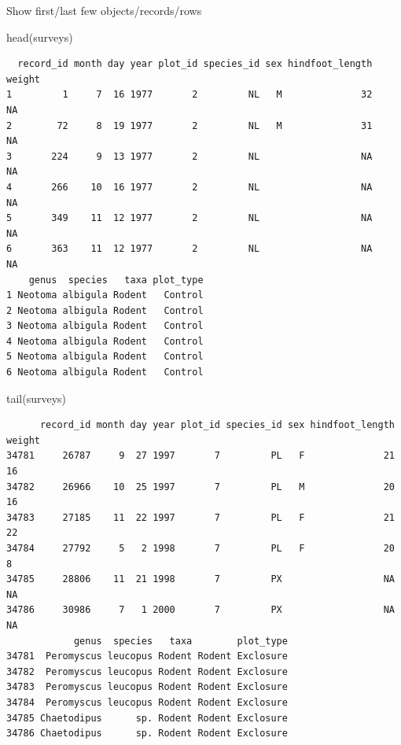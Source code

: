 \documentclass[
  letterpaper,
  DIV=11,
  numbers=noendperiod]{scrreprt}
\newenvironment{Shaded}{\begin{snugshade}}{\end{snugshade}}
\newcommand{\FunctionTok}[1]{\textcolor[rgb]{0.28,0.35,0.67}{#1}}
\newcommand{\NormalTok}[1]{\textcolor[rgb]{0.00,0.23,0.31}{#1}}
\begin{document}
Show first/last few objects/records/rows

\begin{Shaded}
\begin{Highlighting}[]
\FunctionTok{head}\NormalTok{(surveys)}
\end{Highlighting}
\end{Shaded}

\begin{verbatim}
  record_id month day year plot_id species_id sex hindfoot_length weight
1         1     7  16 1977       2         NL   M              32     NA
2        72     8  19 1977       2         NL   M              31     NA
3       224     9  13 1977       2         NL                  NA     NA
4       266    10  16 1977       2         NL                  NA     NA
5       349    11  12 1977       2         NL                  NA     NA
6       363    11  12 1977       2         NL                  NA     NA
    genus  species   taxa plot_type
1 Neotoma albigula Rodent   Control
2 Neotoma albigula Rodent   Control
3 Neotoma albigula Rodent   Control
4 Neotoma albigula Rodent   Control
5 Neotoma albigula Rodent   Control
6 Neotoma albigula Rodent   Control
\end{verbatim}

\begin{Shaded}
\begin{Highlighting}[]
\FunctionTok{tail}\NormalTok{(surveys)}
\end{Highlighting}
\end{Shaded}

\begin{verbatim}
      record_id month day year plot_id species_id sex hindfoot_length weight
34781     26787     9  27 1997       7         PL   F              21     16
34782     26966    10  25 1997       7         PL   M              20     16
34783     27185    11  22 1997       7         PL   F              21     22
34784     27792     5   2 1998       7         PL   F              20      8
34785     28806    11  21 1998       7         PX                  NA     NA
34786     30986     7   1 2000       7         PX                  NA     NA
            genus  species   taxa        plot_type
34781  Peromyscus leucopus Rodent Rodent Exclosure
34782  Peromyscus leucopus Rodent Rodent Exclosure
34783  Peromyscus leucopus Rodent Rodent Exclosure
34784  Peromyscus leucopus Rodent Rodent Exclosure
34785 Chaetodipus      sp. Rodent Rodent Exclosure
34786 Chaetodipus      sp. Rodent Rodent Exclosure
\end{verbatim}
\end{document}
